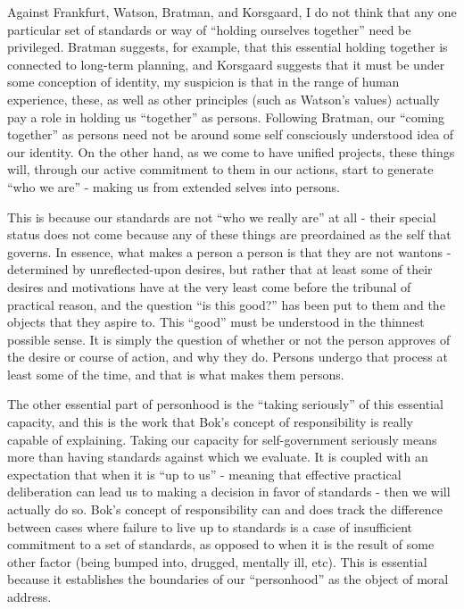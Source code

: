 \documentclass[phd,12pt,oneside,paper=letterpaper]{ubcthesis}
\begin{document}
Against Frankfurt, Watson, Bratman, and Korsgaard, I do not think that any one particular set of standards or way of ``holding ourselves together'' need be privileged. Bratman \citep{bratman2007} suggests, for example, that this essential holding together is connected to long-term planning, and Korsgaard \citep{korsgaard1996, korsgaard2009} suggests that it must be under some conception of identity, my suspicion is that in the range of human experience, these, as well as other principles (such as Watson's \citeyearpar{watson1986} values) actually pay a role in holding us ``together'' as persons. Following Bratman, our ``coming together'' as persons need not be around some self consciously understood idea of our identity. On the other hand, as we come to have unified projects, these things will, through our active commitment to them in our actions, start to generate ``who we are'' - making us from extended selves into persons. 

This is because our standards are not ``who we really are'' at all - their special status does not come because any of these things are preordained as the self that governs. In essence, what makes a person a person is that they are not wantons - determined by unreflected-upon desires, but rather that at least some of their desires and motivations have at the very least come before the tribunal of practical reason, and the question ``is this good?'' has been put to them and the objects that they aspire to. This ``good'' must be understood in the thinnest possible sense. It is simply the question of whether or not the person approves of the desire or course of action, and why they do. Persons undergo that process at least some of the time, and that is what makes them persons. 

The other essential part of personhood is the ``taking seriously'' of this essential capacity, and this is the work that Bok's concept of responsibility is really capable of explaining. Taking our capacity for self-government seriously means more than having standards against which we evaluate. It is coupled with an expectation that when it is ``up to us'' - meaning that effective practical deliberation can lead us to making a decision in favor of standards - then we will actually do so. Bok's concept of responsibility can and does track the difference between cases where failure to live up to standards is a case of insufficient commitment to a set of standards, as opposed to when it is the result of some other factor (being bumped into, drugged, mentally ill, etc). This is essential because it establishes the boundaries of our ``personhood'' as the object of moral address. 
\end{document}
